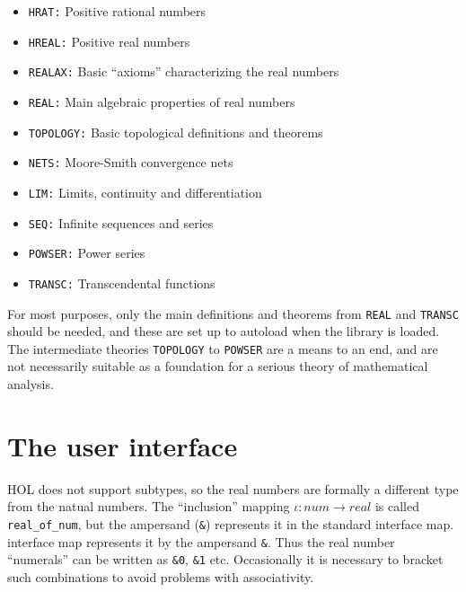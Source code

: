 \begin{itemize}

\item{\tt HRAT:} Positive rational numbers

\item{\tt HREAL:} Positive real numbers

\item{\tt REALAX:} Basic ``axioms'' characterizing the real numbers

\item{\tt REAL:} Main algebraic properties of real numbers

\item{\tt TOPOLOGY:} Basic topological definitions and theorems

\item{\tt NETS:} Moore-Smith convergence nets

\item{\tt LIM:} Limits, continuity and differentiation

\item{\tt SEQ:} Infinite sequences and series

\item{\tt POWSER:} Power series

\item{\tt TRANSC:} Transcendental functions

\end{itemize}

For most purposes, only the main definitions and theorems from {\tt REAL} and
{\tt TRANSC} should be needed, and these are set up to autoload when the
library is loaded. The intermediate theories {\tt TOPOLOGY} to {\tt POWSER} are
a means to an end, and are not necessarily suitable as a foundation for a
serious theory of mathematical analysis.

\section{The user interface}

HOL does not support subtypes, so the real numbers are formally a different
type from the natual numbers. The ``inclusion'' mapping
$\iota: num \rightarrow real$ is called {\tt real\_of\_num}, but the ampersand
({\tt \&}) represents it in the standard interface map.
interface map represents it by the ampersand {\tt \&}. Thus the real number
``numerals'' can be written as {\tt \&0}, {\tt \&1} etc. Occasionally it is
necessary to bracket such combinations to avoid problems with associativity.

